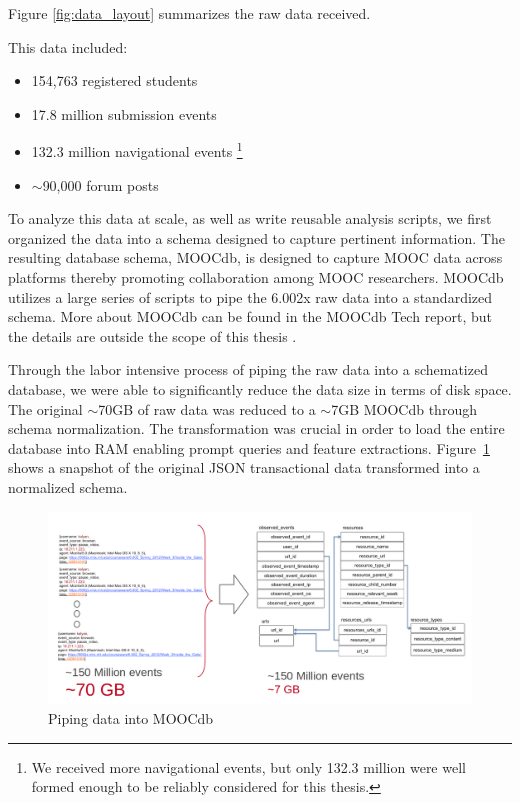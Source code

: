 Figure \ref{fig:data_layout} summarizes the raw data received.

This data included:
\begin{itemize}
\item 154,763 registered students
\item 17.8 million submission events
\item 132.3 million navigational events \footnote{We received more navigational events, but only 132.3 million were well formed enough to be reliably considered for this thesis. }
\item $\sim$90,000 forum posts
\end{itemize}

To analyze this data at scale, as well as write reusable analysis scripts, we first organized the data into a schema designed to capture pertinent information. The resulting database schema, MOOCdb, is designed to capture MOOC data across platforms thereby promoting collaboration among MOOC researchers. MOOCdb utilizes a large series of  scripts to pipe the 6.002x raw data into a standardized schema. More about MOOCdb can be found in the MOOCdb Tech report, but the details are outside the scope of this thesis \cite{tr}.

Through the labor intensive process of piping the raw data into a schematized database, we were able to significantly reduce the data size in terms of disk space. The original $\sim$70GB of raw data was reduced to a $\sim$7GB MOOCdb through schema normalization. The transformation was crucial in order to load the entire database into RAM enabling prompt queries and feature extractions. Figure~\ref{fig:data_reduction} shows a snapshot of the original JSON transactional data transformed into a normalized schema.

\begin{figure}[ht!]
  \caption{Piping data into MOOCdb}\label{fig:data_reduction}
  \centering
    \includegraphics[width=1.0\textwidth]{figures/data_reduction.png}
\end{figure}

